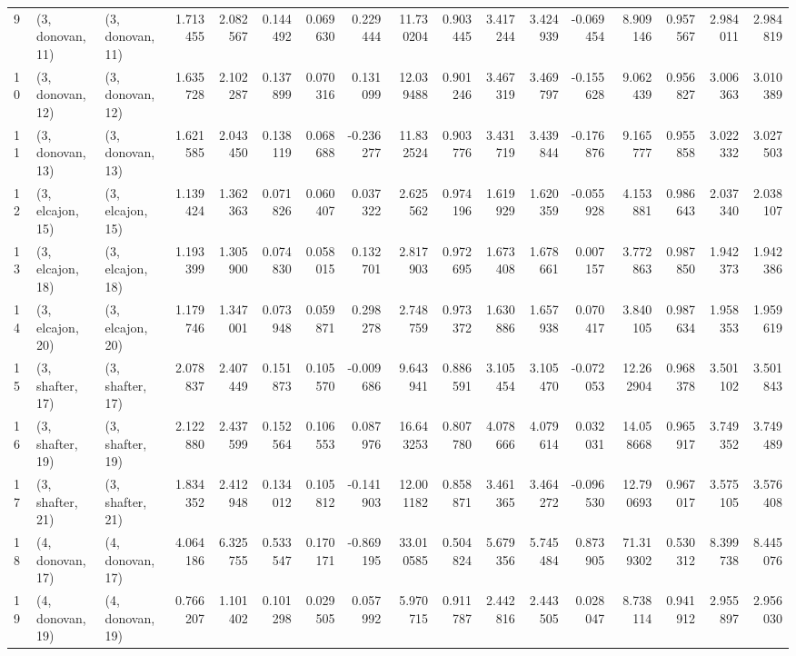 \begin{tabular}{lllrrrrrrrrrrrrrr}
9  &  (3, donovan, 11) &  (3, donovan, 11) &  1.713455 &  2.082567 &   0.144492 &  0.069630 &  0.229444 &  11.730204 &  0.903445 &   3.417244 &  3.424939 & -0.069454 &   8.909146 &  0.957567 &  2.984011 &  2.984819 \\
10 &  (3, donovan, 12) &  (3, donovan, 12) &  1.635728 &  2.102287 &   0.137899 &  0.070316 &  0.131099 &  12.039488 &  0.901246 &   3.467319 &  3.469797 & -0.155628 &   9.062439 &  0.956827 &  3.006363 &  3.010389 \\
11 &  (3, donovan, 13) &  (3, donovan, 13) &  1.621585 &  2.043450 &   0.138119 &  0.068688 & -0.236277 &  11.832524 &  0.903776 &   3.431719 &  3.439844 & -0.176876 &   9.165777 &  0.955858 &  3.022332 &  3.027503 \\
12 &  (3, elcajon, 15) &  (3, elcajon, 15) &  1.139424 &  1.362363 &   0.071826 &  0.060407 &  0.037322 &   2.625562 &  0.974196 &   1.619929 &  1.620359 & -0.055928 &   4.153881 &  0.986643 &  2.037340 &  2.038107 \\
13 &  (3, elcajon, 18) &  (3, elcajon, 18) &  1.193399 &  1.305900 &   0.074830 &  0.058015 &  0.132701 &   2.817903 &  0.972695 &   1.673408 &  1.678661 &  0.007157 &   3.772863 &  0.987850 &  1.942373 &  1.942386 \\
14 &  (3, elcajon, 20) &  (3, elcajon, 20) &  1.179746 &  1.347001 &   0.073948 &  0.059871 &  0.298278 &   2.748759 &  0.973372 &   1.630886 &  1.657938 &  0.070417 &   3.840105 &  0.987634 &  1.958353 &  1.959619 \\
15 &  (3, shafter, 17) &  (3, shafter, 17) &  2.078837 &  2.407449 &   0.151873 &  0.105570 & -0.009686 &   9.643941 &  0.886591 &   3.105454 &  3.105470 & -0.072053 &  12.262904 &  0.968378 &  3.501102 &  3.501843 \\
16 &  (3, shafter, 19) &  (3, shafter, 19) &  2.122880 &  2.437599 &   0.152564 &  0.106553 &  0.087976 &  16.643253 &  0.807780 &   4.078666 &  4.079614 &  0.032031 &  14.058668 &  0.965917 &  3.749352 &  3.749489 \\
17 &  (3, shafter, 21) &  (3, shafter, 21) &  1.834352 &  2.412948 &   0.134012 &  0.105812 & -0.141903 &  12.001182 &  0.858871 &   3.461365 &  3.464272 & -0.096530 &  12.790693 &  0.967017 &  3.575105 &  3.576408 \\
18 &  (4, donovan, 17) &  (4, donovan, 17) &  4.064186 &  6.325755 &   0.533547 &  0.170171 & -0.869195 &  33.010585 &  0.504824 &   5.679356 &  5.745484 &  0.873905 &  71.319302 &  0.530312 &  8.399738 &  8.445076 \\
19 &  (4, donovan, 19) &  (4, donovan, 19) &  0.766207 &  1.101402 &   0.101298 &  0.029505 &  0.057992 &   5.970715 &  0.911787 &   2.442816 &  2.443505 &  0.028047 &   8.738114 &  0.941912 &  2.955897 &  2.956030 \\

\end{tabular}
